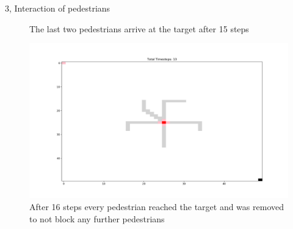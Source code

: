 \documentclass[10pt,a4paper]{article}
\begin{document}
\begin{task}{3, Interaction of pedestrians}
\begin{figure}
    \caption{The last two pedestrians arrive at the target after 15 steps}
    \label{fig:3_15}
\end{figure}
\begin{figure}
    \centering
    \includegraphics[width=\textwidth]{pictures/Figure_16.png}
    \caption{After 16 steps every pedestrian reached the target and was removed to not block any further pedestrians}
    \label{fig:3_16}
\end{figure}
\end{task}
\end{document}

